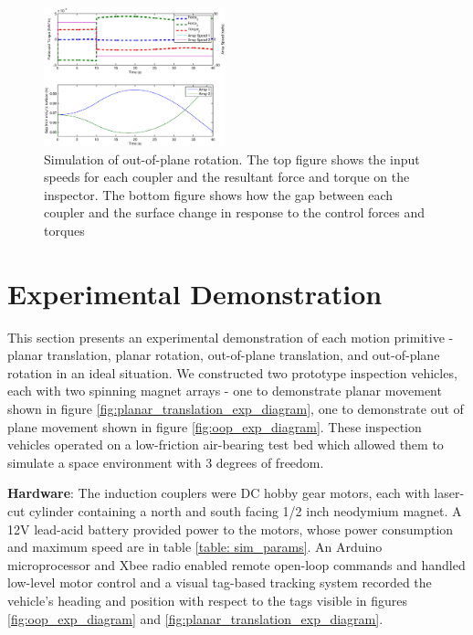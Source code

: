 \documentclass[letterpaper, 10 pt, conference]{ieeeconf}  %
\begin{document}
   \begin{figure}[thpb]
      \centering
      \includegraphics[width = 0.47\textwidth]{figures/curve_rotations.eps}
      \caption{Simulation of out-of-plane rotation. The top figure shows the input speeds for each coupler and the resultant force and torque on the inspector. The bottom figure shows how the gap between each coupler and the surface change in response to the control forces and torques}
      \label{fig:oop_rotation_sim}
   \end{figure}

\section{Experimental Demonstration}\label{sec:experiments}
This section presents an experimental demonstration of each motion primitive - planar translation, planar rotation, out-of-plane translation, and out-of-plane rotation in an ideal situation. We constructed two prototype inspection vehicles, each with two spinning magnet arrays - one to demonstrate planar movement shown in figure \ref{fig:planar_translation_exp_diagram}, one to demonstrate out of plane movement shown in figure \ref{fig:oop_exp_diagram}. These inspection vehicles operated on a low-friction air-bearing test bed which allowed them to simulate a space environment with 3 degrees of freedom. 

\par \textbf{Hardware}: The induction couplers were DC hobby gear motors, each with laser-cut cylinder containing a north and south facing 1/2 inch neodymium magnet. A 12V lead-acid battery provided power to the motors, whose power consumption and maximum speed are in table \ref{table: sim_params}. An Arduino microprocessor and Xbee radio enabled remote open-loop commands and handled low-level motor control and a visual tag-based tracking system recorded the vehicle's heading and position with respect to the tags visible in figures \ref{fig:oop_exp_diagram} and \ref{fig:planar_translation_exp_diagram}. 
\end{document}

